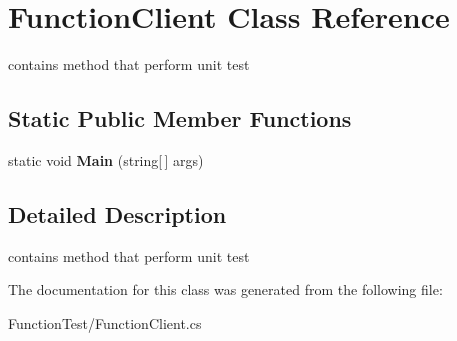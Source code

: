 \hypertarget{class_function_client}{\section{Function\+Client Class Reference}
\label{class_function_client}
}


contains method that perform unit test  


\subsection*{Static Public Member Functions}
\begin{DoxyCompactItemize}
\item 
\hypertarget{class_function_client_ad031387c3e1770f13e114d21b0f63d17}{static void {\bfseries Main} (string\mbox{[}$\,$\mbox{]} args)}\label{class_function_client_ad031387c3e1770f13e114d21b0f63d17}

\end{DoxyCompactItemize}


\subsection{Detailed Description}
contains method that perform unit test 

The documentation for this class was generated from the following file\+:\begin{DoxyCompactItemize}
\item 
Function\+Test/Function\+Client.\+cs\end{DoxyCompactItemize}
